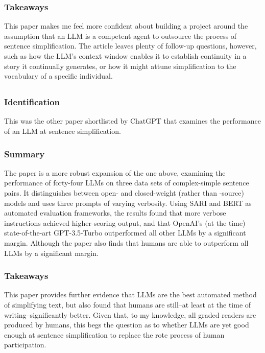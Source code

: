 \documentclass[
	letterpaper, %
]{jdf}
\begin{document}
\subsubsection{Takeaways}
This paper makes me feel more confident about building a project around the assumption that an LLM is a competent agent to outsource the process of sentence simplification. The article leaves plenty of follow-up questions, however, such as how the LLM's context window enables it to establish continuity in a story it continually generates, or how it might attune simplification to the vocabulary of a specific individual.

\subsection{}
\subsubsection{Identification}
This was the other paper shortlisted by ChatGPT that examines the performance of an LLM at sentence simplification.

\subsubsection{Summary}
The paper is a more robust expansion of the one above, examining the performance of forty-four LLMs on three data sets of complex-simple sentence pairs. It distinguishes between open- and closed-weight (rather than -source) models and uses three prompts of varying verbosity. Using SARI and BERT as automated evaluation frameworks, the results found that more verbose instructions achieved higher-scoring output, and that OpenAI's (at the time) state-of-the-art GPT-3.5-Turbo outperformed all other LLMs by a significant margin. Although the paper also finds that humans are able to outperform all LLMs by a significant margin.

\subsubsection{Takeaways}
This paper provides further evidence that LLMs are the best automated method of simplifying text, but also found that humans are still–at least at the time of writing–significantly better. Given that, to my knowledge, all graded readers are produced by humans, this begs the question as to whether LLMs are yet good enough at sentence simplification to replace the rote process of human participation.
\end{document}
